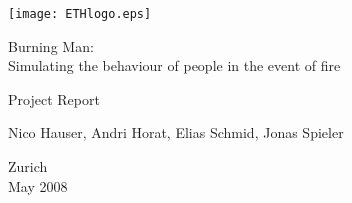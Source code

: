 
\thispagestyle{empty}

\begin{center}
\texttt{[image: ETHlogo.eps]}

\bigskip


\bigskip


\bigskip


\LARGE{ Burning Man:\\ }
\LARGE{ Simulating the behaviour of people in the event of fire\\}

\bigskip

\bigskip

\small{Project Report}\\

\bigskip

\bigskip

\bigskip

\bigskip


\bigskip

\bigskip

\bigskip

\LARGE{Nico Hauser, Andri Horat, Elias Schmid, Jonas Spieler}



\bigskip

\bigskip

\bigskip

\bigskip

\bigskip

\bigskip

\bigskip

\bigskip

Zurich\\
May 2008\\

\end{center}


